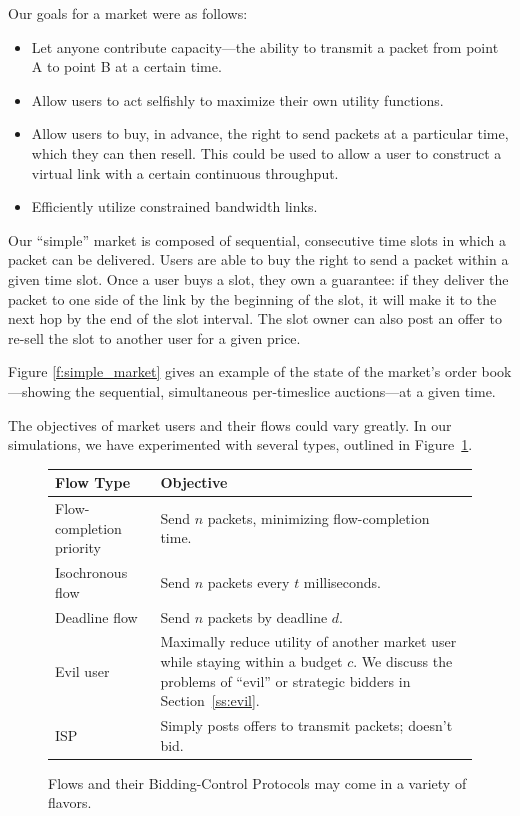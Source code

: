Our goals for a market were as follows:
\begin{itemize}
\item Let anyone contribute capacity---the ability to transmit a
packet from point A to point B at a certain time.

\item Allow users to act selfishly to maximize their own utility
functions.

\item Allow users to buy, in advance, the right to send packets at a
particular time, which they can then resell. This could be used to
allow a user to construct a virtual link with a certain continuous
throughput.

\item Efficiently utilize constrained bandwidth links.
\end{itemize}

Our ``simple'' market is composed of sequential, consecutive time
slots in which a packet can be delivered. Users are able to buy the
right to send a packet within a given time slot.  Once a user buys a slot,
they own a guarantee: if they deliver the packet to one
side of the link by the beginning of the slot, it will make it to the
next hop by the end of the slot interval. The slot owner can also post an offer to re-sell
the slot to another user for a given price.

Figure \ref{f:simple_market} gives an example of the state of the
market's order book---showing the sequential, simultaneous per-timeslice
auctions---at a given time.

The objectives of market users and their flows could vary greatly. In our simulations,
we have experimented with several types, outlined in Figure~\ref{f:user_types}.
\begin{figure}
\small
\begin{tabular}{|p{}|p{}|}
\hline
Flow Type & Objective \\
\hline
\hline
Flow-completion priority & Send $n$ packets, minimizing flow-completion time. \\
\hline
Isochronous flow & Send $n$ packets every $t$ milliseconds. \\
\hline
Deadline flow & Send $n$ packets by deadline $d$. \\
\hline
Evil user & Maximally reduce utility of another market user while
staying within a budget $c$. We discuss the problems of ``evil'' or
strategic bidders in Section~\ref{ss:evil}. \\
\hline
ISP & Simply posts offers to transmit packets; doesn't bid. \\
\hline
\end{tabular}
\caption{Flows and their Bidding-Control Protocols may come in a variety of flavors.}
\label{f:user_types}
\end{figure}

